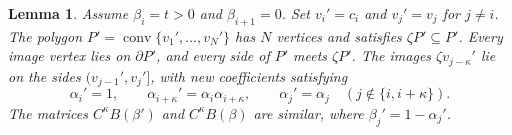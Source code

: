 \documentclass[11pt,a4paper]{article}
\newtheorem{lemma}[theorem]{Lemma}
\theoremstyle{definition}
\theoremstyle{remark}
\numberwithin{equation}{section}
\begin{document}
\begin{lemma}\label{lem:interchange}
Assume $\beta_i=t>0$ and $\beta_{i+1}=0$. Set $v_i'=c_i$ and $v_j'=v_j$ for $j\ne i$. The polygon $P'=\operatorname{conv}\{v_1',\ldots,v_N'\}$ has $N$ vertices and satisfies $\zeta P'\subseteq P'$. Every image vertex lies on $\partial P'$, and every side of $P'$ meets $\zeta P'$. The images $\zeta v_{j-\kappa}'$ lie on the sides $(v_{j-1}',v_j']$, with new coefficients satisfying
\begin{equation}\label{eq:coalescence}
 \alpha_i'=1,\qquad \alpha_{i+\kappa}'=\alpha_i\alpha_{i+\kappa},
 \qquad \alpha_j'=\alpha_j\quad(j\notin\{i,i+\kappa\}).
\end{equation}
The matrices $C^\kappa B(\beta')$ and $C^\kappa B(\beta)$ are similar, where $\beta_j'=1-\alpha_j'$.
\end{lemma}
\end{document}
